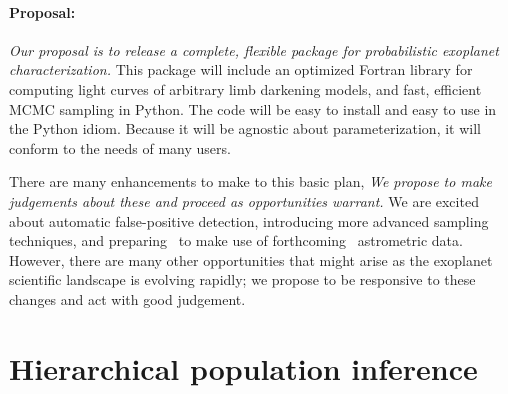 \documentclass[letterpaper,12pt,preprint]{hack_aastex}
\newcommand{\Bart}{\package{Bart}}
\begin{document}
\paragraph{Proposal:}
\emph{Our proposal is to release a complete, flexible package for
  probabilistic exoplanet characterization.}  This package will
include an optimized Fortran library for computing light curves of
arbitrary limb darkening models, and fast, efficient MCMC sampling in
Python.  The code will be easy to install and easy to use in the
Python idiom.  Because it will be agnostic about parameterization, it
will conform to the needs of many users.

There are many enhancements to make to this basic plan, \emph{We
  propose to make judgements about these and proceed as opportunities
  warrant.}  We are excited about automatic false-positive detection,
introducing more advanced sampling techniques, and preparing \Bart\ to
make use of forthcoming \Gaia\ astrometric data.  However, there are
many other opportunities that might arise as the exoplanet scientific
landscape is evolving rapidly; we propose to be responsive to these
changes and act with good judgement.


\section{Hierarchical population inference}
\end{document}
